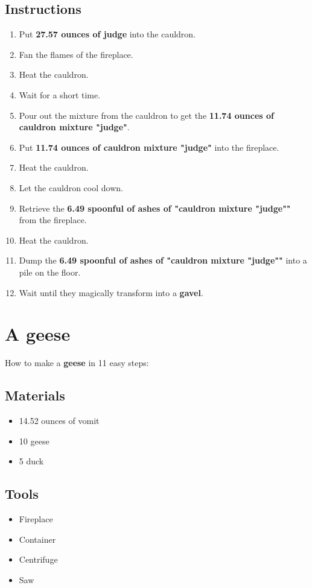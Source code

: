 \documentclass{article}
\begin{document}
\subsection{Instructions}\begin{enumerate}
\item 
Put \textbf{27.57 ounces of judge} into the cauldron.
\item 
Fan the flames of the fireplace.
\item 
Heat the cauldron.
\item 
Wait for a short time.
\item 
Pour out the mixture from the cauldron to get the \textbf{11.74 ounces of cauldron mixture "judge"}.
\item 
Put \textbf{11.74 ounces of cauldron mixture "judge"} into the fireplace.
\item 
Heat the cauldron.
\item 
Let the cauldron cool down.
\item 
Retrieve the \textbf{6.49 spoonful of ashes of "cauldron mixture "judge""} from the fireplace.
\item 
Heat the cauldron.
\item 
Dump the \textbf{6.49 spoonful of ashes of "cauldron mixture "judge""} into a pile on the floor.
\item 
Wait until they magically transform into a \textbf{gavel}.
\end{enumerate}
\newpage
\section{A geese}How to make a \textbf{geese} in 11 easy steps:

\subsection{Materials}\begin{itemize}
\item 
14.52 ounces of vomit
\item 
10 geese
\item 
5 duck
\end{itemize}
\subsection{Tools}\begin{itemize}
\item 
Fireplace
\item 
Container
\item 
Centrifuge
\item 
Saw
\end{itemize}
\end{document}

